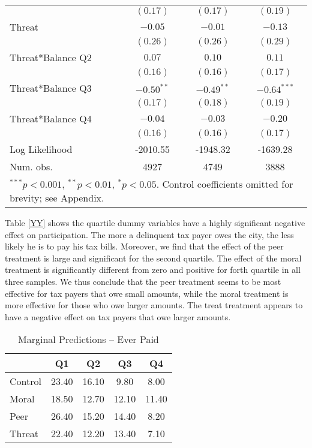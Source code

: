 \documentclass[12pt,titlepage]{article}
\begin{document}
\begin{table}[htbp]
{\begin{center}
\begin{tabular}{l c c c }
                  & $(0.17)$      & $(0.17)$      & $(0.19)$      \\
Threat            & $-0.05$       & $-0.01$       & $-0.13$       \\
                  & $(0.26)$      & $(0.26)$      & $(0.29)$      \\
Threat*Balance Q2 & $0.07$        & $0.10$        & $0.11$        \\
                  & $(0.16)$      & $(0.16)$      & $(0.17)$      \\
Threat*Balance Q3 & $-0.50^{**}$  & $-0.49^{**}$  & $-0.64^{***}$ \\
                  & $(0.17)$      & $(0.18)$      & $(0.19)$      \\
Threat*Balance Q4 & $-0.04$       & $-0.03$       & $-0.20$       \\
                  & $(0.16)$      & $(0.16)$      & $(0.17)$      \\
\hline
Log Likelihood    & -2010.55      & -1948.32      & -1639.28      \\
Num. obs.         & 4927          & 4749          & 3888          \\
\hline
\multicolumn{4}{l}{\scriptsize{$^{***}p<0.001$, $^{**}p<0.01$, $^*p<0.05$. Control coefficients omitted for brevity; see Appendix.}}
\end{tabular}
\end{center}
}
\end{table}

Table \ref{YY} shows the quartile dummy variables have a highly
significant negative effect on participation. The more a delinquent
tax payer owes the city, the less likely he is to pay his tax
bills. Moreover, we find that the effect of the peer treatment is
large and significant for the second quartile. The effect of the moral
treatment is significantly different from zero and positive for forth
quartile in all three samples. We thus conclude that the peer
treatment seems to be most effective for tax payers that owe small
amounts, while the moral treatment is more effective for those who owe
larger amounts. The treat treatment appears to have a negative effect
on tax payers that owe larger amounts.

\begin{table}[htbp]
\caption{Marginal  Predictions -- Ever Paid}  \label{ZZ}
\centering
\begin{tabular}{lcccc}
  \hline
 & Q1 & Q2 & Q3 & Q4 \\ 
  \hline
Control & 23.40 & 16.10 & 9.80 & 8.00 \\ 
  Moral & 18.50 & 12.70 & 12.10 & 11.40 \\ 
  Peer & 26.40 & 15.20 & 14.40 & 8.20 \\ 
  Threat & 22.40 & 12.20 & 13.40 & 7.10 \\ 
   \hline
\end{tabular}
\end{table}
\end{document}
